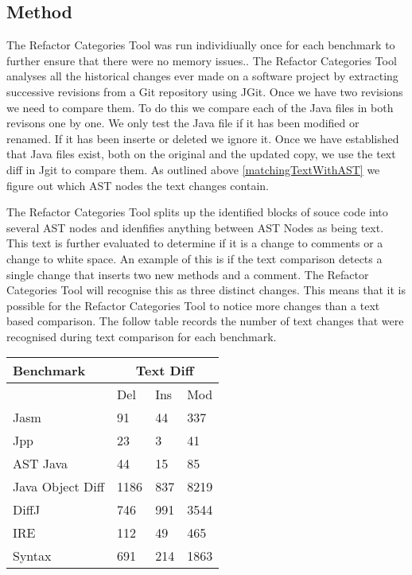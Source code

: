 \subsection{Method}
The Refactor Categories Tool was run individiually once for each benchmark to further ensure that there were no memory issues..  The Refactor Categories Tool analyses all the historical changes ever made on a software project by extracting successive revisions from a Git repository using JGit.  Once we have two revisions we need to compare them.  To do this we compare each of the Java files in both revisons one by one. We only test the Java file if it has been modified or renamed.  If it has been inserte or deleted we ignore it. Once we have established that Java files exist, both on the original and the updated copy, we use the text diff in Jgit to compare them. As outlined above \ref{matchingTextWithAST} we figure out which AST nodes the text changes contain. 

The Refactor Categories Tool splits up the identified blocks of souce code into several AST nodes and idenfifies anything between AST Nodes as being text. This text is further evaluated to determine if it is a change to comments or a change to white space. An example of this is if the text comparison detects a single change that inserts two new methods and a comment.  The Refactor Categories Tool will recognise this as three distinct changes. This means that it is possible for the Refactor Categories Tool to notice more changes than a text based comparison. The follow table records the number of text changes that were recognised during text comparison for each benchmark.

\begin{table}[H]
    \begin{tabular}{l|lll}
    Benchmark        & \multicolumn{3}{|c}{Text Diff} \\ \hline
    ~                & Del            & Ins & Mod  \\ \hline
    Jasm             & 91             & 44  & 337  \\
    Jpp              & 23             & 3   & 41   \\
    AST Java         & 44             & 15  & 85   \\
    Java Object Diff & 1186           & 837 & 8219 \\
    DiffJ            & 746            & 991 & 3544 \\
    IRE              & 112            & 49  & 465  \\
    Syntax           & 691            & 214 & 1863 \\
    \end{tabular}
\end{table}



